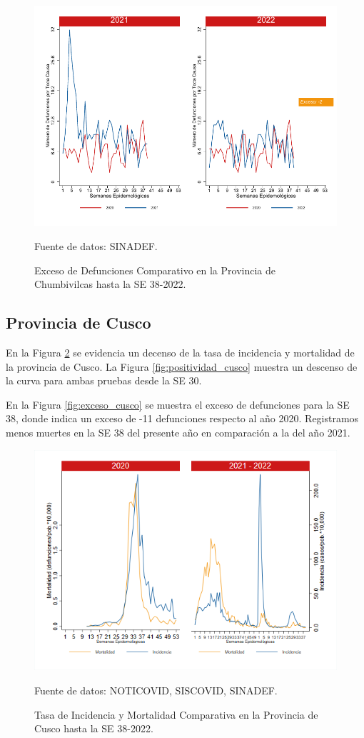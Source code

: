\documentclass[12pt,a4paper,openany]{book}
\begin{document}
	\begin{figure}[h]
		\caption{Exceso de Defunciones Comparativo en la Provincia de Chumbivilcas hasta la SE 38-2022.}\label{fig:exceso_chumbivilcas}
		\begin{center}
			\includegraphics[width=0.7\linewidth]{../figuras/exceso_6.pdf}
		\end{center}
		{\footnotesize {Fuente de datos: SINADEF.}}
	\end{figure}
	
	\clearpage
	
	\subsection*{Provincia de Cusco}
	\noindent En la Figura \ref{fig:inc_mort_cusco} se evidencia un decenso de la tasa de incidencia y mortalidad de la provincia de Cusco.  
	\noindent La  Figura \ref{fig:positividad_cusco} muestra un descenso de la curva para ambas pruebas desde la SE 30.
	
	En la Figura \ref{fig:exceso_cusco} se muestra el exceso de defunciones para la SE 38, donde indica un exceso de -11 defunciones respecto al año 2020. Registramos menos muertes en la SE 38 del presente año en comparación a la del año 2021.
	
	\begin{figure}[h]
		\caption{Tasa de Incidencia y Mortalidad Comparativa en la Provincia de Cusco hasta la SE 38-2022.}\label{fig:inc_mort_cusco}
		\begin{center}
			\includegraphics[width=0.85\linewidth]{../figuras/incidencia_mortalidad_20_21_7.png}
		\end{center}
		{\footnotesize {Fuente de datos: NOTICOVID, SISCOVID, SINADEF.}}
	\end{figure}
	
\end{document}

